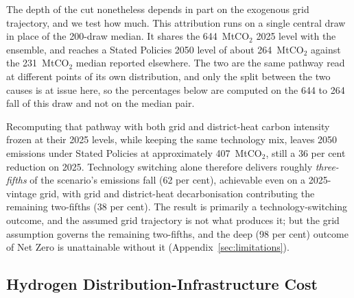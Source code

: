 The depth of the cut nonetheless depends in part on the exogenous grid trajectory,
and we test how much. This attribution runs on a single central draw in place of the 200-draw median. It shares the 644~MtCO$_2$ 2025 level with the ensemble, and reaches a Stated Policies 2050 level of about 264~MtCO$_2$ against the 231~MtCO$_2$ median reported elsewhere. The two are the same pathway read at different points of its own distribution, and only the split between the two causes is at issue here, so the percentages below are computed on the 644 to 264 fall of this draw and not on the median pair.

Recomputing that pathway with both grid and district-heat
carbon intensity frozen at their 2025 levels, while keeping the same technology
mix, leaves 2050 emissions under Stated Policies at approximately 407~MtCO$_2$,
still a 36 per cent reduction on 2025. Technology switching alone therefore
delivers roughly \emph{three-fifths} of the scenario's emissions fall (62 per cent),
achievable even on a 2025-vintage grid, with grid and district-heat decarbonisation
contributing the remaining two-fifths (38 per cent). The result is primarily a technology-switching outcome, and the assumed grid trajectory
is not what produces it; but the grid
assumption governs the remaining two-fifths, and the deep (98 per cent) outcome of Net Zero
is unattainable without it (Appendix~\ref{sec:limitations}).


\subsection{Hydrogen Distribution-Infrastructure Cost}
\label{sec:results:h2infra}

